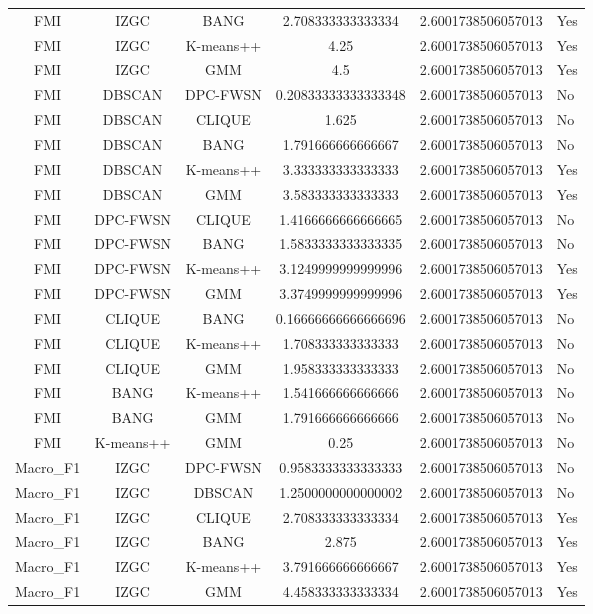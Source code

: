 \begin{table}[ht]
\begin{tabular}{cccc}
FMI & IZGC & BANG & 2.708333333333334 & 2.6001738506057013 & Yes\\
FMI & IZGC & K-means++ & 4.25 & 2.6001738506057013 & Yes\\
FMI & IZGC & GMM & 4.5 & 2.6001738506057013 & Yes\\
FMI & DBSCAN & DPC-FWSN & 0.20833333333333348 & 2.6001738506057013 & No\\
FMI & DBSCAN & CLIQUE & 1.625 & 2.6001738506057013 & No\\
FMI & DBSCAN & BANG & 1.791666666666667 & 2.6001738506057013 & No\\
FMI & DBSCAN & K-means++ & 3.333333333333333 & 2.6001738506057013 & Yes\\
FMI & DBSCAN & GMM & 3.583333333333333 & 2.6001738506057013 & Yes\\
FMI & DPC-FWSN & CLIQUE & 1.4166666666666665 & 2.6001738506057013 & No\\
FMI & DPC-FWSN & BANG & 1.5833333333333335 & 2.6001738506057013 & No\\
FMI & DPC-FWSN & K-means++ & 3.1249999999999996 & 2.6001738506057013 & Yes\\
FMI & DPC-FWSN & GMM & 3.3749999999999996 & 2.6001738506057013 & Yes\\
FMI & CLIQUE & BANG & 0.16666666666666696 & 2.6001738506057013 & No\\
FMI & CLIQUE & K-means++ & 1.708333333333333 & 2.6001738506057013 & No\\
FMI & CLIQUE & GMM & 1.958333333333333 & 2.6001738506057013 & No\\
FMI & BANG & K-means++ & 1.541666666666666 & 2.6001738506057013 & No\\
FMI & BANG & GMM & 1.791666666666666 & 2.6001738506057013 & No\\
FMI & K-means++ & GMM & 0.25 & 2.6001738506057013 & No\\
Macro_F1 & IZGC & DPC-FWSN & 0.9583333333333333 & 2.6001738506057013 & No\\
Macro_F1 & IZGC & DBSCAN & 1.2500000000000002 & 2.6001738506057013 & No\\
Macro_F1 & IZGC & CLIQUE & 2.708333333333334 & 2.6001738506057013 & Yes\\
Macro_F1 & IZGC & BANG & 2.875 & 2.6001738506057013 & Yes\\
Macro_F1 & IZGC & K-means++ & 3.791666666666667 & 2.6001738506057013 & Yes\\
Macro_F1 & IZGC & GMM & 4.458333333333334 & 2.6001738506057013 & Yes\\

\end{tabular}
\end{table}
